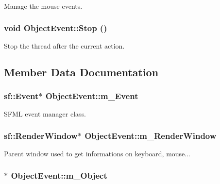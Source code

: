 Manage the mouse events. \hypertarget{classObjectEvent_fc881fdc9cf9352370716c9240eecd4f}{
\subsubsection[Stop]{\setlength{\rightskip}{0pt plus 5cm}void ObjectEvent::Stop ()}}
\label{classObjectEvent_fc881fdc9cf9352370716c9240eecd4f}




Stop the thread after the current action. 

\subsection{Member Data Documentation}
\hypertarget{classObjectEvent_c03cec5b97d4a2038c6f75d7b679e997}{
\subsubsection[m\_\-Event]{\setlength{\rightskip}{0pt plus 5cm}sf::Event$\ast$ {\bf ObjectEvent::m\_\-Event}}}
\label{classObjectEvent_c03cec5b97d4a2038c6f75d7b679e997}


SFML event manager class. 

\hypertarget{classObjectEvent_9a1b0ae1d8f82924abfa682e59f40eb8}{
\subsubsection[m\_\-RenderWindow]{\setlength{\rightskip}{0pt plus 5cm}sf::RenderWindow$\ast$ {\bf ObjectEvent::m\_\-RenderWindow}}}
\label{classObjectEvent_9a1b0ae1d8f82924abfa682e59f40eb8}


Parent window used to get informations on keyboard, mouse... \hypertarget{classObjectEvent_4ef3c90c68494a5af8b740694a2a8f48}{
\subsubsection[m\_\-Object]{$\ast$ {\bf ObjectEvent::m\_\-Object}}}
\label{classObjectEvent_4ef3c90c68494a5af8b740694a2a8f48}


